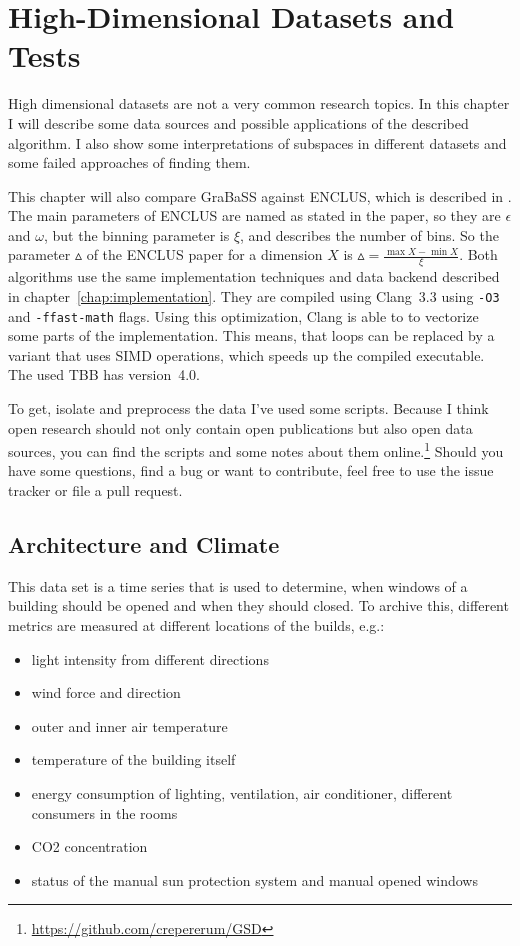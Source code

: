 \chapter{High-Dimensional Datasets and Tests}\label{chap:datasets}
High dimensional datasets are not a very common research topics. In this chapter I will describe some data sources and possible applications of the described algorithm. I also show some interpretations of subspaces in different datasets and some failed approaches of finding them.

This chapter will also compare GraBaSS against ENCLUS, which is described in \cite{enclus}. The main parameters of ENCLUS are named as stated in the paper, so they are $\epsilon$ and $\omega$, but the binning parameter is $\xi$, and describes the number of bins. So the parameter $\vartriangle$ of the ENCLUS paper for a dimension $X$ is $\vartriangle = \frac{\max{X} - \min{X}}{\xi}$. Both algorithms use the same implementation techniques and data backend described in chapter~\ref{chap:implementation}. They are compiled using Clang~3.3 using \texttt{-O3} and \texttt{-ffast-math} flags. Using this optimization, Clang is able to to vectorize some parts of the implementation. This means, that loops can be replaced by a variant that uses SIMD operations, which speeds up the compiled executable. The used TBB has version~4.0.

To get, isolate and preprocess the data I've used some scripts. Because I think open research should not only contain open publications but also open data sources, you can find the scripts and some notes about them online.\footnote{\url{https://github.com/crepererum/GSD}} Should you have some questions, find a bug or want to contribute, feel free to use the issue tracker or file a pull request.

\section{Architecture and Climate}
This data set is a time series that is used to determine, when windows of a building should be opened and when they should closed. To archive this, different metrics are measured at different locations of the builds, e.g.:
\begin{itemize}
	\item light intensity from different directions
	\item wind force and direction
	\item outer and inner air temperature
	\item temperature of the building itself
	\item energy consumption of lighting, ventilation, air conditioner, different consumers in the rooms
	\item CO2 concentration
	\item status of the manual sun protection system and manual opened windows
\end{itemize}

